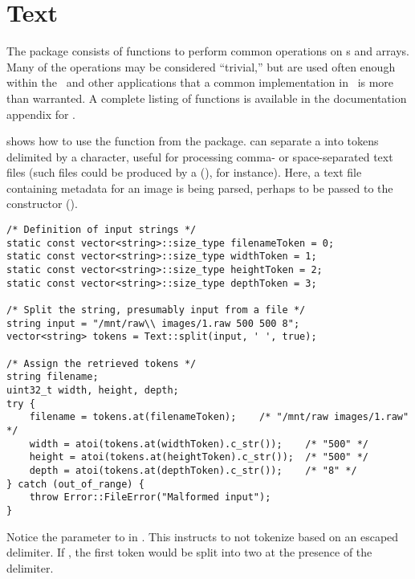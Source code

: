 %
%
\chapter{Text}
\label{chp-text}
The  package consists of functions to perform common operations
on s and  arrays.  Many of the operations may be
considered ``trivial,'' but are used often enough within the \lname\ and
other applications that a common implementation in \sname\ is more
than warranted.  A complete listing of functions is available in the
documentation appendix for .

 shows how to use the  function from the
 package.   can separate a  into
tokens delimited by a character, useful for processing comma- or
space-separated text files (such files could be produced by a
 (), for instance).  Here, a text file
containing metadata for an image is being parsed, perhaps to be passed to 
the  constructor ().


\begin{lstlisting}[caption={Tokenizing a \class{string}}, label=text-split]
/* Definition of input strings */
static const vector<string>::size_type filenameToken = 0;
static const vector<string>::size_type widthToken = 1;
static const vector<string>::size_type heightToken = 2;
static const vector<string>::size_type depthToken = 3;

/* Split the string, presumably input from a file */
string input = "/mnt/raw\\ images/1.raw 500 500 8";
vector<string> tokens = Text::split(input, ' ', true);

/* Assign the retrieved tokens */
string filename;
uint32_t width, height, depth;
try {
	filename = tokens.at(filenameToken);	/* "/mnt/raw images/1.raw" */
	width = atoi(tokens.at(widthToken).c_str());	/* "500" */
	height = atoi(tokens.at(heightToken).c_str());	/* "500" */
	depth = atoi(tokens.at(depthToken).c_str());	/* "8" */
} catch (out_of_range) {
	throw Error::FileError("Malformed input");
}
\end{lstlisting}

Notice the  parameter to  in .
This instructs  to not tokenize based on an escaped delimiter.
If , the first token would be split into two at the presence of the
delimiter.


